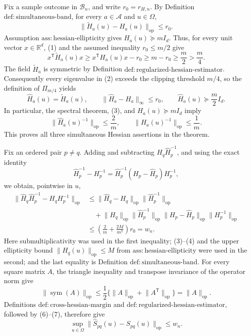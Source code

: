 Fix a sample outcome in \(\mathcal B_n\), and write \(r_0=r_{H,n}\).  By Definition \(\mathrm{def:simultaneous\text{-}band}\), for every \(a\in\mathcal A\) and \(u\in\Omega\),
\[
 \lVert\widetilde H_a(u)-H_a(u)\rVert_{\mathrm{op}}\le r_0.
 \tag{1}
\]
Assumption \(\mathrm{ass:hessian\text{-}ellipticity}\) gives \(H_a(u)\succeq mI_d\).  Thus, for every unit vector \(x\in\mathbb R^d\), (1) and the assumed inequality \(r_0\le m/2\) give
\[
 x^{\mathsf T}\widetilde H_a(u)x
 \ge x^{\mathsf T}H_a(u)x-r_0
 \ge m-r_0
 \ge \frac m2>\frac m4.
 \tag{2}
\]
The field \(\widetilde H_a\) is symmetric by Definition \(\mathrm{def:regularized\text{-}hessian\text{-}estimator}\).  Consequently every eigenvalue in (2) exceeds the clipping threshold \(m/4\), so the definition of \(\Pi_{m/4}\) yields
\[
 \widehat H_a(u)=\widetilde H_a(u),
 \qquad
 \lVert\widehat H_a-H_a\rVert_\infty\le r_0,
 \qquad
 \widehat H_a(u)\succeq\frac m2I_d.
 \tag{3}
\]
In particular, the spectral theorem, (3), and \(H_a(u)\succeq mI_d\) imply
\[
 \lVert\widehat H_a(u)^{-1}\rVert_{\mathrm{op}}\le\frac2m,
 \qquad
 \lVert H_a(u)^{-1}\rVert_{\mathrm{op}}\le\frac1m.
 \tag{4}
\]
This proves all three simultaneous Hessian assertions in the theorem.

Fix an ordered pair \(p\ne q\).  Adding and subtracting \(H_q\widehat H_p^{-1}\), and using the exact identity
\[
 \widehat H_p^{-1}-H_p^{-1}
 =\widehat H_p^{-1}(H_p-\widehat H_p)H_p^{-1},
 \tag{5}
\]
we obtain, pointwise in \(u\),
\[
\begin{aligned}
 \lVert\widehat H_q\widehat H_p^{-1}-H_qH_p^{-1}\rVert_{\mathrm{op}}
 &\le
 \lVert\widehat H_q-H_q\rVert_{\mathrm{op}}
 \lVert\widehat H_p^{-1}\rVert_{\mathrm{op}}\\
 &\quad+
 \lVert H_q\rVert_{\mathrm{op}}
 \lVert\widehat H_p^{-1}\rVert_{\mathrm{op}}
 \lVert H_p-\widehat H_p\rVert_{\mathrm{op}}
 \lVert H_p^{-1}\rVert_{\mathrm{op}}\\
 &\le
 \left(\frac2m+\frac{2M}{m^2}\right)r_0
 =w_n.
\end{aligned}
 \tag{6}
\]
Here submultiplicativity was used in the first inequality; (3)--(4) and the upper ellipticity bound \(\lVert H_q(u)\rVert_{\mathrm{op}}\le M\) from \(\mathrm{ass:hessian\text{-}ellipticity}\) were used in the second; and the last equality is Definition \(\mathrm{def:simultaneous\text{-}band}\).  For every square matrix \(A\), the triangle inequality and transpose invariance of the operator norm give
\[
 \lVert\operatorname{sym}(A)\rVert_{\mathrm{op}}
 \le\frac12\{\lVert A\rVert_{\mathrm{op}}+\lVert A^{\mathsf T}\rVert_{\mathrm{op}}\}
 =\lVert A\rVert_{\mathrm{op}}.
 \tag{7}
\]
Definitions \(\mathrm{def:cross\text{-}hessian\text{-}margin}\) and \(\mathrm{def:regularized\text{-}hessian\text{-}estimator}\), followed by (6)--(7), therefore give
\[
 \sup_{u\in\Omega}
 \lVert\widehat S_{pq}(u)-S_{pq}(u)\rVert_{\mathrm{op}}
 \le w_n.
 \tag{8}
\]

